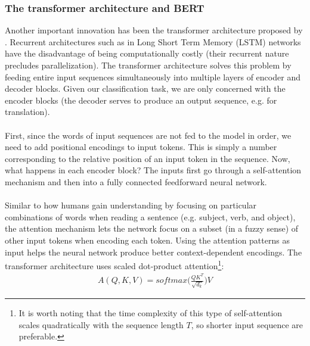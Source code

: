 \subsubsection{The transformer architecture and BERT}
Another important innovation has been the transformer architecture proposed by \citet{vaswani2017attention}. Recurrent architectures such as in Long Short Term Memory (LSTM) networks have the disadvantage of being computationally costly (their recurrent nature precludes parallelization). The transformer architecture solves this problem by feeding entire input sequences simultaneously into multiple layers of encoder and decoder blocks. Given our classification task, we are only concerned with the encoder blocks (the decoder serves to produce an output sequence, e.g. for translation). \\\\
First, since the words of input sequences are not fed to the model in order, we need to add positional encodings to input tokens. This is simply a number corresponding to the relative position of an input token in the sequence. Now, what happens in each encoder block? The inputs first go through a self-attention mechanism and then into a fully connected feedforward neural network. \\\\
Similar to how humans gain understanding by focusing on particular combinations  of words when reading a sentence (e.g. subject, verb, and object), the attention mechanism lets the network focus on a subset (in a fuzzy sense) of other input tokens when encoding each token. Using the attention patterns as input helps the neural network produce better context-dependent encodings. The transformer architecture uses scaled dot-product attention\footnote{It is worth noting that the time complexity of this type of self-attention scales quadratically with the sequence length $T$, so shorter input sequence are preferable.}:
\begin{gather*}
    A(Q,K,V) = softmax\bigg(\frac{QK^T}{\sqrt{d_k}}\bigg)V
\end{gather*}
